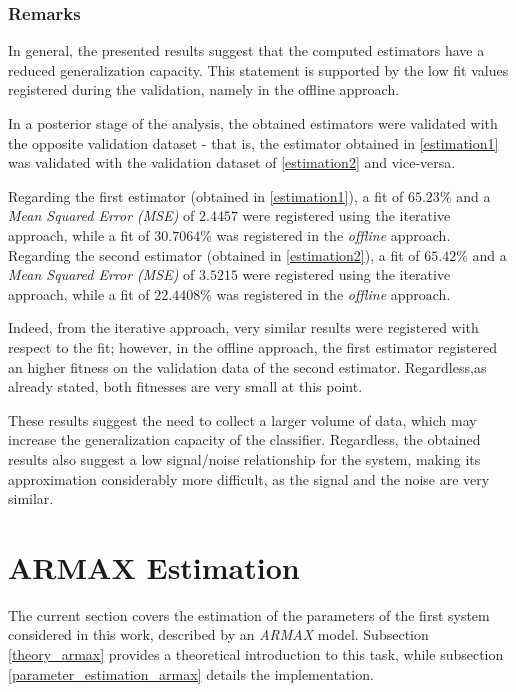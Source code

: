\documentclass[11pt]{article}
\begin{document}
\subsubsection{Remarks}

In general, the presented results suggest that the computed estimators have a reduced generalization capacity. This statement is supported by the low fit values registered during the validation, namely in the offline approach.

In a posterior stage of the analysis, the obtained estimators were validated with the opposite validation dataset - that is, the estimator obtained in \ref{estimation1} was validated with the validation dataset of \ref{estimation2} and vice-versa.

Regarding the first estimator (obtained in \ref{estimation1}), a fit of $65.23\%$ and a \emph{Mean Squared Error (MSE)} of $2.4457$ were registered using the iterative approach, while a fit of $30.7064 \%$ was registered in the \emph{offline} approach. Regarding the second estimator (obtained in \ref{estimation2}), a fit of $65.42\%$ and a \emph{Mean Squared Error (MSE)} of $3.5215$ were registered using the iterative approach, while a fit of $22.4408 \%$ was registered in the \emph{offline} approach.

Indeed, from the iterative approach, very similar results were registered with respect to the fit; however, in the offline approach, the first estimator registered an higher fitness on the validation data of the second estimator. Regardless,as already stated, both fitnesses are very small at this point.

These results suggest the need to collect a larger volume of data, which may increase the generalization capacity of the classifier. Regardless, the obtained results also suggest a low signal/noise relationship for the system, making its approximation considerably more difficult, as the signal and the noise are very similar.

\section{ARMAX Estimation}
\label{armax_estimation}

The current section covers the estimation of the parameters of the first system considered in this work, described by an \emph{ARMAX} model. Subsection \ref{theory_armax} provides a theoretical introduction to this task, while subsection \ref{parameter_estimation_armax} details the implementation.
\end{document}
